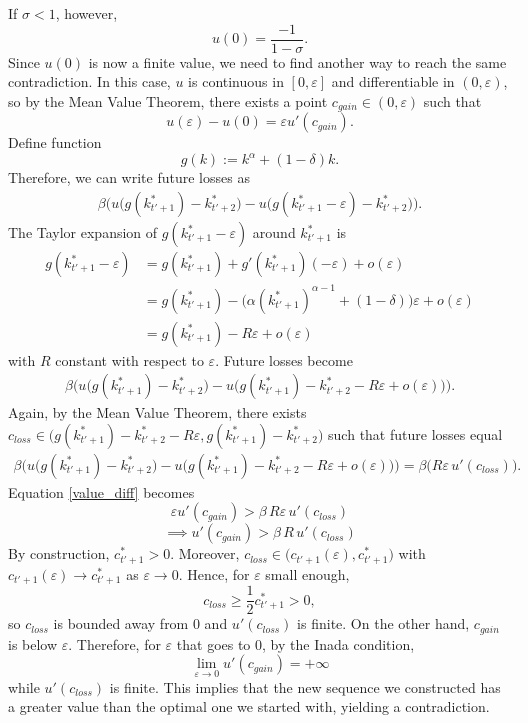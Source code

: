 If $\sigma < 1$, however, $$u (0)  = \frac{-1}{1 - \sigma}.$$
Since $u(0)$ is now a finite value, we need to find another way to reach the same contradiction. In this case, $u$ is continuous in $[0, \varepsilon]$ and differentiable in $(0, \varepsilon)$, so by the Mean Value Theorem, there exists a point $c_{gain} \in (0, \varepsilon)$ such that $$u(\varepsilon) - u(0) = \varepsilon u'(c_{gain}).$$
Define function \[
g (k) := k^\alpha + (1 - \delta)k.
\]
Therefore, we can write future losses as 
\begin{align*}
    \beta \Big( u \big(g(k_{t'+1}^*) - k_{t' + 2}^*\big) - u \big(g(k^*_{t'+1}- \varepsilon)- k_{t' + 2}^*\big)  \Big).
\end{align*}
The Taylor expansion of $g(k^*_{t'+1} - \varepsilon)$ around $k^*_{t'+1}$ is 
\begin{align*}
g(k^*_{t'+1}- \varepsilon) &= g(k^*_{t'+1}) + g'(k^*_{t'+1})(-\varepsilon) + o(\varepsilon) \\
& = g(k^*_{t'+1}) - \big(\alpha(k^*_{t'+ 1})^{\alpha - 1} + (1 - \delta)\big)  \varepsilon  + o (\varepsilon)\\
& = g(k^*_{t'+1}) - R \varepsilon  + o (\varepsilon)
\end{align*}
with $R$ constant with respect to $\varepsilon$.
Future losses become
\begin{align*}
    \beta \Big(u \big(g(k_{t'+1}^*) - k_{t' + 2}^*\big) - u \big(g(k^*_{t'+1})- k_{t' + 2}^* - R \varepsilon  + o (\varepsilon)\big)  \Big).
\end{align*}
Again, by the Mean Value Theorem, there exists $c_{loss} \in \big(g(k^*_{t'+1})- k_{t' + 2}^* - R \varepsilon, g(k^*_{t'+1})- k_{t' + 2}^*\big)$ such that future losses equal 
\begin{align*}
     \beta \Big( u \big(g(k_{t'+1}^*) - k_{t' + 2}^*\big) - u \big(g(k^*_{t'+1})- k_{t' + 2}^* - R \varepsilon  + o (\varepsilon)\big)\Big) = \beta\Big(R\varepsilon\, u'(c_{loss})\Big).
\end{align*}
Equation \eqref{value_diff} becomes 
\[\varepsilon u'(c_{gain}) > \beta\,R\varepsilon\, u'(c_{loss}) \]
\[\implies u'(c_{gain}) > \beta\,R\, u'(c_{loss})\]
By construction, $c_{t'+1}^*>0$. Moreover, $c_{loss}\in\big(c_{t'+1}(\varepsilon),c_{t'+1}^*\big)$ with $c_{t'+1}(\varepsilon)\to c_{t'+1}^*$ as $\varepsilon\to 0$. Hence, for $\varepsilon$ small enough,
\[
c_{loss} \ge \frac{1}{2}c_{t'+1}^* > 0,
\]
so $c_{loss}$ is bounded away from $0$ and $u'(c_{loss})$ is finite. On the other hand,  $c_{gain}$ is below $\varepsilon$. Therefore, for $\varepsilon$ that goes to 0, by the Inada condition, 
\[\lim_{\varepsilon \to 0} u'(c_{gain}) = + \infty\]
while $u'(c_{loss})$ is finite. This implies that the new sequence we constructed has a greater value than the optimal one we started with, yielding a contradiction.

